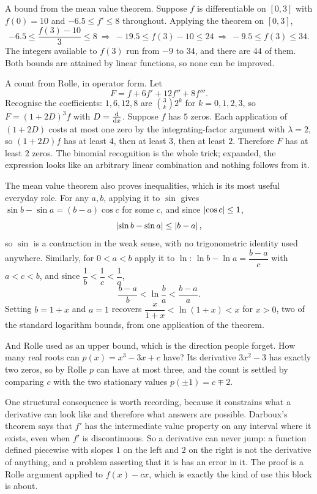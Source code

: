 \begin{worked}
A bound from the mean value theorem. Suppose $f$ is differentiable on $[0,3]$ with $f(0)=10$ and $-6.5\leq f'\leq8$ throughout. Applying the theorem on $[0,3]$,
\[
-6.5\leq\frac{f(3)-10}{3}\leq8\ \Longrightarrow\ -19.5\leq f(3)-10\leq24\ \Longrightarrow\ -9.5\leq f(3)\leq34 .
\]
The integers available to $f(3)$ run from $-9$ to $34$, and there are $44$ of them. Both bounds are attained by linear functions, so none can be improved.

A count from Rolle, in operator form. Let
\[
F=f+6f'+12f''+8f''' .
\]
Recognise the coefficients: $1,6,12,8$ are $\binom3k2^{k}$ for $k=0,1,2,3$, so $F=(1+2D)^{3}f$ with $D=\frac{\mathrm{d}}{\mathrm{d}x}$. Suppose $f$ has $5$ zeros. Each application of $(1+2D)$ costs at most one zero by the integrating-factor argument with $\lambda=2$, so $(1+2D)f$ has at least $4$, then at least $3$, then at least $2$. Therefore $F$ has at least $2$ zeros. The binomial recognition is the whole trick; expanded, the expression looks like an arbitrary linear combination and nothing follows from it.

The mean value theorem also proves inequalities, which is its most useful everyday role. For any $a,b$, applying it to $\sin$ gives $\sin b-\sin a=(b-a)\cos c$ for some $c$, and since $\left\lvert \cos c\right\rvert\leq1$,
\[
\left\lvert \sin b-\sin a\right\rvert\leq\left\lvert b-a\right\rvert ,
\]
so $\sin$ is a contraction in the weak sense, with no trigonometric identity used anywhere. Similarly, for $0<a<b$ apply it to $\ln$: $\ln b-\ln a=\dfrac{b-a}{c}$ with $a<c<b$, and since $\dfrac1b<\dfrac1c<\dfrac1a$,
\[
\frac{b-a}{b}<\ln\frac ba<\frac{b-a}{a} .
\]
Setting $b=1+x$ and $a=1$ recovers $\dfrac{x}{1+x}<\ln(1+x)<x$ for $x>0$, two of the standard logarithm bounds, from one application of the theorem.

And Rolle used as an upper bound, which is the direction people forget. How many real roots can $p(x)=x^{3}-3x+c$ have? Its derivative $3x^{2}-3$ has exactly two zeros, so by Rolle $p$ can have at most three, and the count is settled by comparing $c$ with the two stationary values $p(\pm1)=c\mp2$.
\end{worked}

One structural consequence is worth recording, because it constrains what a derivative can look like and therefore what answers are possible. Darboux's theorem says that $f'$ has the intermediate value property on any interval where it exists, even when $f'$ is discontinuous. So a derivative can never jump: a function defined piecewise with slopes $1$ on the left and $2$ on the right is not the derivative of anything, and a problem asserting that it is has an error in it. The proof is a Rolle argument applied to $f(x)-cx$, which is exactly the kind of use this block is about.

